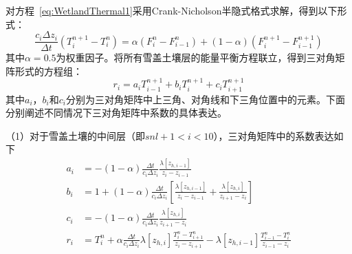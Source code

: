 对方程~\eqref{eq:WetlandThermal1}采用Crank-Nicholson半隐式格式求解，得到以下形式：
\begin{equation}
    \frac{c_i\Delta z_i}{\Delta t}\left(T^{n+1}_i - T^n_i\right)=\alpha \left(F^n_i - F^n_{i-1}\right) + \left(1-\alpha \right) \left(F^{n+1}_i - F^{n+1}_{i-1}\right)
\end{equation}
其中$\alpha = 0.5$为权重因子。将所有雪盖土壤层的能量平衡方程联立，得到三对角矩阵形式的方程组：
\begin{equation}
    r_i = a_i T^{n+1}_{i-1} + b_i T^{n+1}_i + c_i T^{n+1}_{i+1}
\end{equation}
其中$a_i$，$b_i$和$c_i$分别为三对角矩阵中上三角、对角线和下三角位置中的元素。下面分别阐述不同情况下三对角矩阵中系数的具体表达。

（1）对于雪盖土壤的中间层（即$snl+1<i<10$），三对角矩阵中的系数表达如下
\begin{equation}
    \begin{aligned}
        a_i &= -\left(1-\alpha \right) \frac{\Delta t}{c_i \Delta z_i} \frac{\lambda \left[z_{h,i-1}\right]}{z_i-z_{i-1}} \\
        b_i &= 1+\left(1-\alpha \right) \frac{\Delta t}{c_i \Delta z_i} \left[\frac{\lambda \left[z_{h,i-1}\right]}{z_i-z_{i-1}} + \frac{\lambda \left[z_{h,i}\right]}{z_{i+1}-z_i}\right] \\
        c_i &= -\left(1-\alpha \right)\frac{\Delta t}{c_i\Delta z_i}\frac{\lambda \left[z_{h,i}\right]}{z_{i+1}-z_i} \\
        r_i &= T_{i}^{n}+\alpha \frac{\Delta t}{c_{i} \Delta z_{i}} \lambda\left[z_{h, i}\right] \frac{T_{i}^{n}-T_{i+1}^{n}}{z_{i}-z_{i+1}}-\lambda\left[z_{h, i-1}\right] \frac{T_{i-1}^{n}-T_{i}^{n}}{z_{i-1}-z_{i}}
    \end{aligned}
\end{equation}

